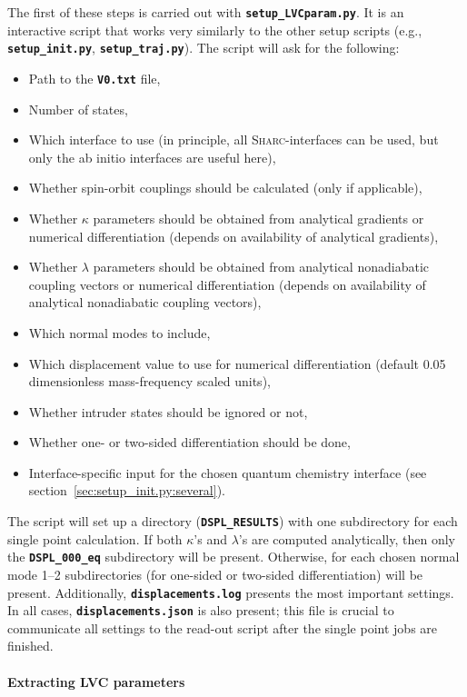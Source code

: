 \documentclass[a4paper,10pt,DIV=15,openany]{scrbook}
\newcommand{\sharc}{\textsc{Sharc}}
\newcommand{\ttt}[1]{\textbf{\texttt{#1}}}
\begin{document}
The first of these steps is carried out with \ttt{setup\_LVCparam.py}.
It is an interactive script that works very similarly to the other setup scripts (e.g., \ttt{setup\_init.py}, \ttt{setup\_traj.py}).
The script will ask for the following:
\begin{itemize}
  \item Path to the \ttt{V0.txt} file,
  \item Number of states,
  \item Which interface to use (in principle, all \sharc-interfaces can be used, but only the ab initio interfaces are useful here),
  \item Whether spin-orbit couplings should be calculated (only if applicable),
  \item Whether $\kappa$ parameters should be obtained from analytical gradients or numerical differentiation (depends on availability of analytical gradients),
  \item Whether $\lambda$ parameters should be obtained from analytical nonadiabatic coupling vectors or numerical differentiation (depends on availability of analytical nonadiabatic coupling vectors),
  \item Which normal modes to include,
  \item Which displacement value to use for numerical differentiation (default 0.05 dimensionless mass-frequency scaled units),
  \item Whether intruder states should be ignored or not,
  \item Whether one- or two-sided differentiation should be done,
  \item Interface-specific input for the chosen quantum chemistry interface (see section~\ref{sec:setup_init.py:several}).
\end{itemize}
The script will set up a directory (\ttt{DSPL\_RESULTS}) with one subdirectory for each single point calculation.
If both $\kappa$'s and $\lambda$'s are computed analytically, then only the \ttt{DSPL\_000\_eq} subdirectory will be present.
Otherwise, for each chosen normal mode 1--2 subdirectories (for one-sided or two-sided differentiation) will be present.
Additionally, \ttt{displacements.log} presents the most important settings.
In all cases, \ttt{displacements.json} is also present; this file is crucial to communicate all settings to the read-out script after the single point jobs are finished.

\paragraph{Extracting LVC parameters}
\end{document}
